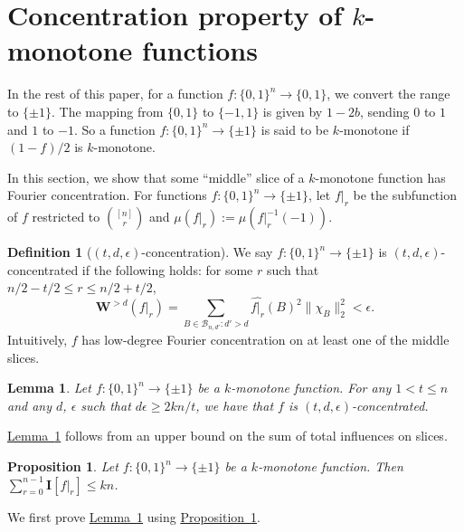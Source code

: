\documentclass[11pt]{article}
\numberwithin{equation}{section}
\newtheorem{lemma}[theorem]{Lemma}
\newtheorem{proposition}[theorem]{Proposition}
\theoremstyle{definition}
\newtheorem{definition}[theorem]{Definition}
\theoremstyle{plain}
\newcommand{\expref}[2]{\hyperref[#2]{#1~\ref{#2}}}
\newcommand{\W}{\mathbf{W}}
\newcommand{\I}{\mathbf{I}}
\newcommand{\warn}[1]{#1}
\begin{document}
\section{Concentration property of $k$-monotone functions}
\warn{In the rest of this paper, for a function $f:\{0,1\}^n\rightarrow\{0,1\}$, we convert the range to $\{\pm 1\}$. 
The mapping from $\{0,1\}$ to $\{-1,1\}$ is given by $1-2b$, sending $0$ to $1$ and $1$ to $-1$. So a function $f:\{0,1\}^n\rightarrow\{\pm 1\}$ is said to be $k$-monotone if $(1-f)/2$ is $k$-monotone.}

In this section, we show 
that %
some ``middle'' slice
of a $k$-monotone function has Fourier concentration. 
For functions $f:\{0,1\}^n\rightarrow\{\pm1\}$, let $f|_r$ be the subfunction of $f$ restricted to %
$\binom{[n]}{r}$ %
and $\mu(f|_r):=\mu(f|_r^{-1}(-1))$.

\begin{definition}[$(t,d,\epsilon)$-concentration]
We say $f:\{0,1\}^n\rightarrow\{\pm1\}$ is $(t,d,\epsilon)$-concentrated if the following holds: for some $r$ such that $n/2-t/2\leq r\leq n/2+t/2$,
%
\begin{equation} %
\W^{>d}(f|_r)=\sum_{B\in \mathcal{B}_{n,d'}: d'> d }\widehat{f|_r}(B)^2\| \chi_B\|_2^2 < \epsilon.
%
\end{equation} %
\warn{Intuitively, $f$ has low-degree Fourier concentration on at least one of the middle slices.}
\end{definition}

\begin{lemma} \label{lm:main}
Let $f:\{0,1\}^n\rightarrow\{\pm1\}$ be a $k$-monotone function.
For any $1<t \leq n$ and any $d$, $\epsilon$ such that $d\epsilon \geq 2kn/t$, 
we have that %
$f$ is $(t, d, \epsilon)$-concentrated.
\end{lemma}

\expref{Lemma}{lm:main} follows from an upper bound on the sum of total influences on slices.
\begin{proposition}\label{prop:main}
Let $f:\{0,1\}^n\rightarrow\{\pm1\}$ be a $k$-monotone function. Then $\sum_{r=0}^{n-1} \I[f|_r]\leq kn$.
\end{proposition}


We first prove \expref{Lemma}{lm:main} using \expref{Proposition}{prop:main}.
\end{document}
